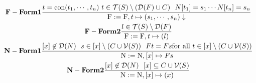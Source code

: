   \begin{gather*}\label{eA1}
   \bold{F-Form1} \frac
   { t = \textnormal{con}(t_1, \cdots,t_n) \ t \in \mathcal{T}(S) \setminus ( \mathcal{D}(F) \cup C)  \ \  N[t_1] = s_1 \cdots N[t_n] = s_n }
   { \textnormal{F} := \textnormal{F}, t \mapsto ( s_1, \cdots, s_n) \downarrow}\\
   \bold{F-Form2} \frac
   { l \in \mathcal{T}(S) \setminus \mathcal{D}(F)}
   { \textnormal{F} := \textnormal{F}, t \mapsto ( l)} \\
    \bold{N-Form1} \frac
    { [x] \not\in \mathcal{D}(N) \ \ s \in [x] \setminus ( C \cup \mathcal{V}(S)) \ \ F t= F s \textnormal{for all} \ t \in [x] \setminus ( C \cup \mathcal{V}(S)) }
    { \textnormal{N}:= \textnormal{N}, [x] \mapsto F s}\\
    \bold{N-Form2} \frac
    { [x] \not\in \mathcal{D}(N) \ \ [x] \subseteq  C \cup \mathcal{V}(S)} 
    { \textnormal{N}:= \textnormal{N}, [x] \mapsto (x)}
  \end{gather*}

